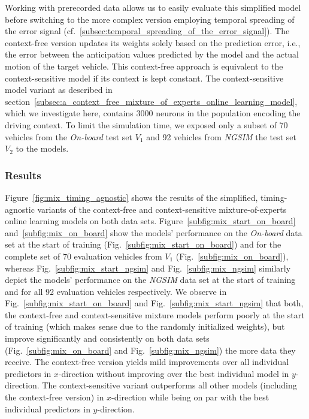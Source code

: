 Working with prerecorded data allows us to easily evaluate this simplified model before switching to the more complex version employing temporal spreading of the error signal (cf.~\ref{subsec:temporal_spreading_of_the_error_signal}).
The context-free version updates its weights solely based on the prediction error, i.e., the error between the anticipation values predicted by the model and the actual motion of the target vehicle.
This context-free approach is equivalent to the context-sensitive model if its context is kept constant.
The context-sensitive model variant as described in section~\ref{subsec:a_context_free_mixture_of_experts_online_learning_model}, which we investigate here, contains \num{3000} neurons in the population encoding the driving context.
To limit the simulation time, we exposed only a subset of \num{70} vehicles from the \emph{On-board} test set $V_1$ and \num{92} vehicles from \emph{\ac{NGSIM}} the test set $V_2$ to the models.

\subsubsection{Results}%
\label{ssubsec:results}

Figure~\ref{fig:mix_timing_agnostic} shows the results of the simplified, timing-agnostic variants of the context-free and context-sensitive mixture-of-experts online learning models on both data sets. 
Figure~\ref{subfig:mix_start_on_board} and~\ref{subfig:mix_on_board} show the models' performance on the \emph{On-board} data set at the start of training (Fig.~\ref{subfig:mix_start_on_board}) and for the complete set of \num{70} evaluation vehicles from $V_1$ (Fig.~\ref{subfig:mix_on_board}), whereas Fig.~\ref{subfig:mix_start_ngsim} and Fig.~\ref{subfig:mix_ngsim} similarly depict the models' performance on the \emph{\ac{NGSIM}} data set at the start of training and for all \num{92} evaluation
vehicles respectively.
We observe in Fig.~\ref{subfig:mix_start_on_board} and Fig.~\ref{subfig:mix_start_ngsim} that both, the context-free and context-sensitive mixture models perform poorly at the start of training (which makes sense due to the randomly initialized weights), but improve significantly and consistently on both data sets (Fig.~\ref{subfig:mix_on_board} and Fig.~\ref{subfig:mix_ngsim}) the more data they receive.
The context-free version yields mild improvements over all individual predictors in $x$-direction without improving over the best individual model in $y$-direction.
The context-sensitive variant outperforms all other models (including the context-free version) in $x$-direction while being on par with the best individual predictors in $y$-direction.

